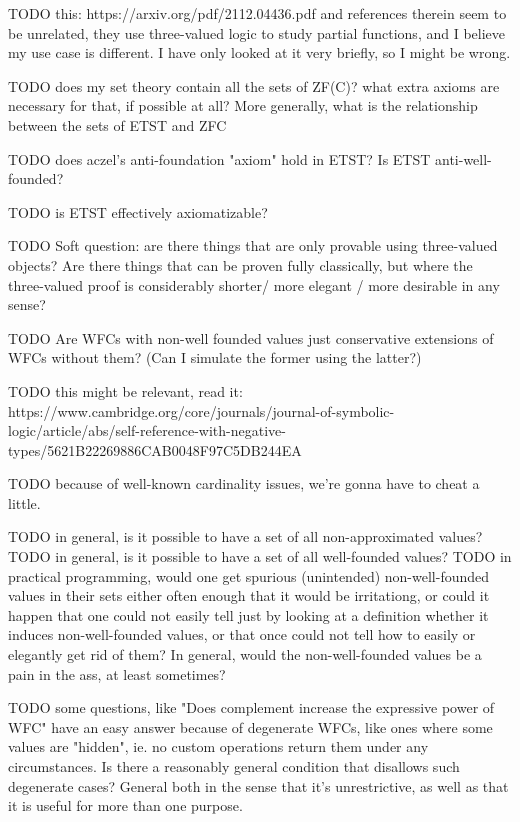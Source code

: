 \documentclass[oneside,12pt]{book}
\newcounter{question}
\theoremstyle{definition}
\theoremstyle{remark}
\begin{document}
TODO this:
https://arxiv.org/pdf/2112.04436.pdf
and references therein seem to be unrelated, they use three-valued logic
to study partial functions, and I believe my use case is different.
I have only looked at it very briefly, so I might be wrong.

TODO does my set theory contain all the sets of ZF(C)? what extra axioms
are necessary for that, if possible at all? More generally, what is the
relationship between the sets of ETST and ZFC

TODO does aczel's anti-foundation "axiom" hold in ETST? Is ETST anti-well-founded?

TODO is ETST effectively axiomatizable?

TODO Soft question: are there things that are only provable using three-valued
objects? Are there things that can be proven fully classically, but where
the three-valued proof is considerably shorter/ more elegant / more desirable
in any sense?

TODO Are WFCs with non-well founded values just conservative extensions of WFCs without them? (Can I simulate the former using the latter?)

TODO this might be relevant, read it:
https://www.cambridge.org/core/journals/journal-of-symbolic-logic/article/abs/self-reference-with-negative-types/5621B22269886CAB0048F97C5DB244EA

TODO because of well-known cardinality issues, we're gonna have to cheat a little.

TODO in general, is it possible to have a set of all non-approximated values?
TODO in general, is it possible to have a set of all well-founded values?
TODO in practical programming, would one get spurious (unintended) non-well-founded
values in their sets either often enough that it would be irritationg, or
could it happen that one could not easily tell just by looking at a definition whether
it induces non-well-founded values, or that once could not tell how to easily or
elegantly get rid of them? In general, would the non-well-founded values be
a pain in the ass, at least sometimes?

TODO some questions, like "Does complement increase the expressive power of
WFC" have an easy answer because of degenerate WFCs, like ones where some values
are "hidden", ie. no custom operations return them under any circumstances.
Is there a reasonably general condition that disallows such degenerate cases?
General both in the sense that it's unrestrictive, as well as that it is useful
for more than one purpose.
\end{document}
